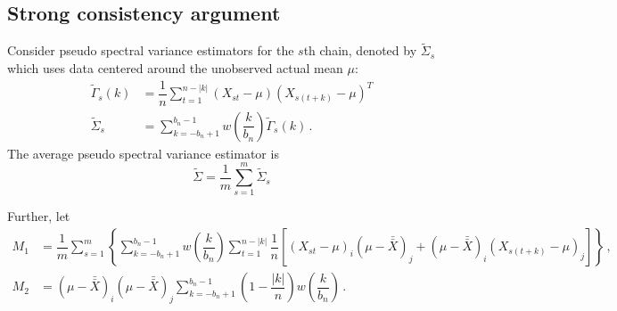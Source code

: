 \documentclass[11pt]{article}
\newcommand{\E}{\mathbb{E}}
\newcommand{\Var}{\text{Var}}
\theoremstyle{remark}
\begin{document}




\subsection{Strong consistency argument} \label{appendix:strong_consis}


Consider pseudo spectral variance estimators for the $s$th chain, denoted by $\tilde{\Sigma}_s$ which uses data centered around the unobserved actual mean $\mu$:
\begin{align*}
    \tilde{\Gamma}_s(k) &= \dfrac{1}{n}\sum_{t=1}^{n-|k|}(X_{st}-\mu)(X_{s(t+k)}-\mu)^T \\ 
    \tilde{\Sigma}_s &= \sum_{k=-b_n+1}^{b_n-1}w\left(\dfrac{k}{b_n}\right)\tilde{\Gamma}_s(k) \,.
\end{align*}
%
The average pseudo spectral variance estimator is
\[
\tilde{\Sigma} = \dfrac{1}{m}\sum\limits_{s=1}^{m}\tilde{\Sigma}_s
\]

Further, let
\begin{align*}
  M_1 & = \dfrac{1}{m}\sum\limits_{s=1}^{m}\left\{\sum\limits_{k=-b_n+1}^{b_n-1}w\left(\dfrac{k}{b_n}\right)\sum\limits_{t=1}^{n-|k|}\dfrac{1}{n}\left[ \left(X_{st}-\mu \right)_i   \left(\mu-\bar{\bar{X}} \right)_j +    \left(\mu-\bar{\bar{X}} \right)_i  \left(X_{s(t+k)}-\mu \right)_j \right]\right\}\,, \\ 
M_2 &= \left(\mu-\bar{\bar{X}} \right)_i   \left(\mu-\bar{\bar{X}} \right)_j\sum\limits_{k=-b_n+1}^{b_n-1}\left(1-\dfrac{|k|}{n}\right)w\left(\dfrac{k}{b_n}\right)\,.
\end{align*}
\end{document}
